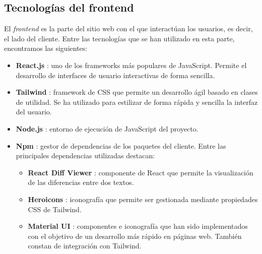 \subsection{Tecnologías del frontend}

El {\it frontend} es la parte del sitio web con el que interactúan los usuarios, es decir, el lado del cliente. Entre las tecnologías que se han utilizado en esta parte, encontramos las siguientes:

\begin{itemize}
    \item {\bf React.js} \cite{react}: uno de los frameworks más populares de JavaScript. Permite el desarrollo de interfaces de usuario interactivas de forma sencilla.
    \item {\bf Tailwind} \cite{tailwind}: framework de CSS \cite{css} que permite un desarrollo ágil basado en clases de utilidad. Se ha utilizado para estilizar de forma rápida y sencilla la interfaz del usuario.
    \item {\bf Node.js} \cite{nodejs}: entorno de ejecución de JavaScript del proyecto.
    \item {\bf Npm} \cite{npm}: gestor de dependencias de los paquetes del cliente. Entre las principales dependencias utilizadas destacan:
        \begin{itemize}
        \item {\bf React Diff Viewer} \cite{reactdiffviewer}: componente de React que permite la visualización de las diferencias entre dos textos.
        \item {\bf Heroicons} \cite{heroicons}: iconografía que permite ser gestionada mediante propiedades CSS de Tailwind.
        \item {\bf Material UI} \cite{materialui}: componentes e iconografía que han sido implementados con el objetivo de un desarrollo más rápido en páginas web. También constan de integración con Tailwind.
        \end{itemize}
\end{itemize}